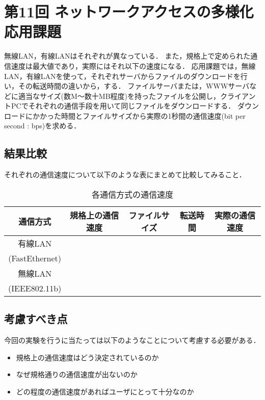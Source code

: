 \section{第11回 ネットワークアクセスの多様化 応用課題}
無線LAN，有線LANはそれぞれ\textbf{}が異なっている．
また，規格上で定められた通信速度は最大値であり，実際にはそれ以下の速度になる．
応用課題では，無線LAN，有線LANを使って，それぞれサーバからファイルのダウンロードを行い，その転送時間の違いから，\textbf{}する．
ファイルサーバまたは，WWWサーバなどに適当なサイズ(数M〜数十MB程度)を持ったファイルを公開し，クライアントPCでそれぞれの通信手段を用いて同じファイルをダウンロードする．
ダウンロードにかかった時間とファイルサイズから実際の1秒間の通信速度(bit per second : bps)を求める．

\subsection*{結果比較}
それぞれの通信速度について以下のような表にまとめて比較してみること．
\begin{table}[h]
 \caption{各通信方式の通信速度}%
 \begin{center}
  \begin{tabular}{|c|c|c|c|c|}
    \hline
     通信方式  &  規格上の通信速度  & ファイルサイズ & 転送時間 &  実際の通信速度 \\
    \hline
     有線LAN & & & & \\
     (FastEthernet)  &    &    &    &    \\
    \hline
     無線LAN & & & & \\
     (IEEE802.11b)  &    &    &    &    \\
    \hline
  \end{tabular}
 \end{center}
\end{table}

\subsection*{考慮すべき点}
今回の実験を行うに当たっては以下のようなことについて考慮する必要がある．
\begin{itemize}
  \item 規格上の通信速度はどう決定されているのか
  \item なぜ規格通りの通信速度が出ないのか
  \item どの程度の通信速度があればユーザにとって十分なのか
\end{itemize}
